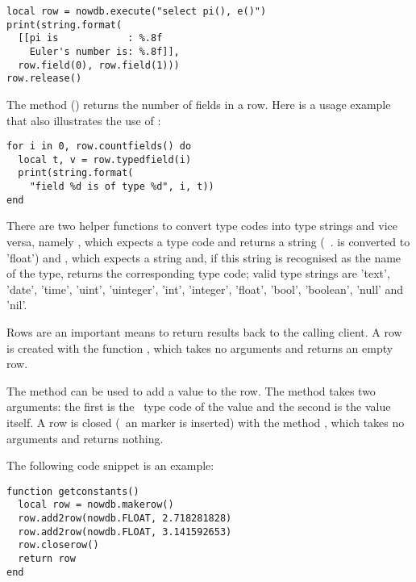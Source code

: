 \begin{lua}
\begin{lstlisting}
local row = nowdb.execute("select pi(), e()")
print(string.format(
  [[pi is            : %.8f
    Euler's number is: %.8f]],
  row.field(0), row.field(1)))
row.release()
\end{lstlisting}
\end{lua}

The method () returns
the number of fields in a row.
Here is a usage example that also
illustrates the use of :

\begin{lua}
\begin{lstlisting}
for i in 0, row.countfields() do
  local t, v = row.typedfield(i)
  print(string.format(
    "field %d is of type %d", i, t))
end
\end{lstlisting}
\end{lua}

There are two helper functions to convert
type codes into type strings and vice versa,
namely ,
which expects a type code and returns a string
(\eg\ .  is converted
to 'float') and
, which expects
a string and, if this string is recognised
as the name of the type, returns the corresponding
type code; valid type strings are
'text', 'date', 'time', 'uint', 'uinteger',
'int', 'integer', 'float', 'bool', 'boolean',
'null' and 'nil'.

Rows are an important means to return 
results back to the calling client.
A row is created with the function
, which takes
no arguments and returns an empty row.

The method  can
be used to add a value to the row.
The method takes two arguments:
the first is the \nowdb\ type code of the value
and the second is the value itself.
A row is closed (\ie\ an  marker
is inserted) with the method
, which takes no arguments
and returns nothing.

The following code snippet is an example:

\begin{lua}
\begin{lstlisting}
function getconstants()
  local row = nowdb.makerow()
  row.add2row(nowdb.FLOAT, 2.718281828)
  row.add2row(nowdb.FLOAT, 3.141592653)
  row.closerow()
  return row
end
\end{lstlisting}
\end{lua}

